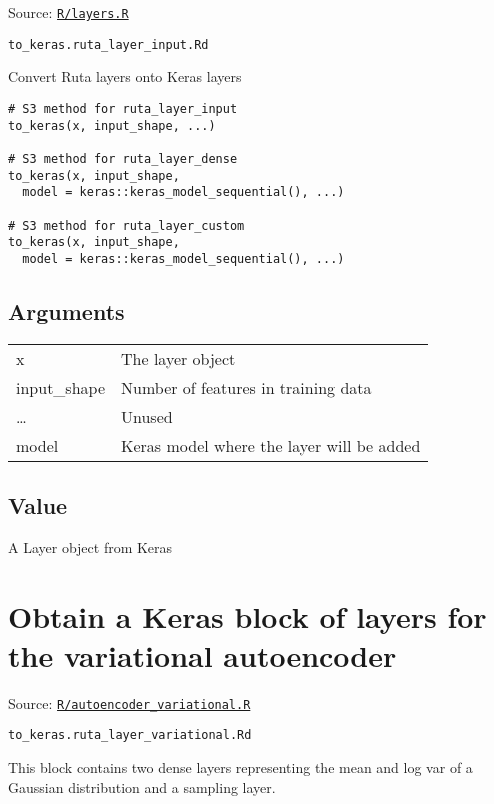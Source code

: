 Source:
\href{https://github.com/fdavidcl/ruta/blob/master/R/layers.R}{\texttt{R/layers.R}}

\texttt{to\_keras.ruta\_layer\_input.Rd}

Convert Ruta layers onto Keras layers

\begin{verbatim}
# S3 method for ruta_layer_input
to_keras(x, input_shape, ...)

# S3 method for ruta_layer_dense
to_keras(x, input_shape,
  model = keras::keras_model_sequential(), ...)

# S3 method for ruta_layer_custom
to_keras(x, input_shape,
  model = keras::keras_model_sequential(), ...)
\end{verbatim}

\hypertarget{arguments}{\subsection{\texorpdfstring{\protect\hyperlink{arguments}{}Arguments}{Arguments}}\label{arguments}}

\begin{longtable}[c]{@{}>{\small}p{3cm}>{\raggedright}p{12.5cm}@{}}
\toprule
x & The layer object\tabularnewline
input\_shape & Number of features in training data\tabularnewline
\ldots{} & Unused\tabularnewline
model & Keras model where the layer will be added\tabularnewline
\bottomrule
\end{longtable}

\hypertarget{value}{\subsection{\texorpdfstring{\protect\hyperlink{value}{}Value}{Value}}\label{value}}

A Layer object from Keras

\section{Obtain a Keras block of layers for the variational
autoencoder}\label{obtain-a-keras-block-of-layers-for-the-variational-autoencoder}

Source:
\href{https://github.com/fdavidcl/ruta/blob/master/R/autoencoder_variational.R}{\texttt{R/autoencoder\_variational.R}}

\texttt{to\_keras.ruta\_layer\_variational.Rd}

This block contains two dense layers representing the mean and log var
of a Gaussian distribution and a sampling layer.

